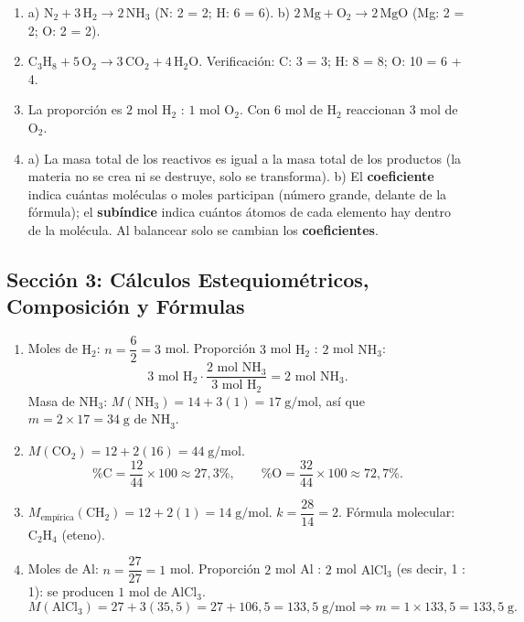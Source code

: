 \documentclass[12pt, letterpaper]{article}
\begin{document}
  \begin{enumerate}[leftmargin=*, label=\textbf{\arabic*.}]
    \item a) $\text{N}_2 + 3\,\text{H}_2 \rightarrow 2\,\text{NH}_3$ (N: 2 = 2; H: 6 = 6). \quad
          b) $2\,\text{Mg} + \text{O}_2 \rightarrow 2\,\text{MgO}$ (Mg: 2 = 2; O: 2 = 2).

    \item $\text{C}_3\text{H}_8 + 5\,\text{O}_2 \rightarrow 3\,\text{CO}_2 + 4\,\text{H}_2\text{O}$.
          Verificación: C: 3 = 3; H: 8 = 8; O: 10 = 6 + 4. \checkmark

    \item La proporción es $2$ mol $\text{H}_2$ : $1$ mol $\text{O}_2$. Con $6$ mol de $\text{H}_2$ reaccionan $3$ mol de $\text{O}_2$.

    \item a) La masa total de los reactivos es igual a la masa total de los productos (la materia no se crea ni se destruye, solo se transforma).
          \quad b) El \textbf{coeficiente} indica cuántas moléculas o moles participan (número grande, delante de la fórmula); el \textbf{subíndice} indica cuántos átomos de cada elemento hay dentro de la molécula. Al balancear solo se cambian los \textbf{coeficientes}.
  \end{enumerate}

  \newpage

  \subsection*{Sección 3: Cálculos Estequiométricos, Composición y Fórmulas}

  \begin{enumerate}[leftmargin=*, label=\textbf{\arabic*.}]
    \item Moles de $\text{H}_2$: $n = \dfrac{6}{2} = 3$ mol.
          Proporción $3$ mol $\text{H}_2$ : $2$ mol $\text{NH}_3$:
          \[
            3 \text{ mol H}_2 \cdot \frac{2 \text{ mol NH}_3}{3 \text{ mol H}_2} = 2 \text{ mol NH}_3.
          \]
          Masa de $\text{NH}_3$: $M(\text{NH}_3) = 14 + 3(1) = 17\;\text{g/mol}$, así que $m = 2 \times 17 = 34\;\text{g de NH}_3$.

    \item $M(\text{CO}_2) = 12 + 2(16) = 44\;\text{g/mol}$.
          \[
            \% \text{C} = \frac{12}{44} \times 100 \approx 27{,}3\%, \qquad \% \text{O} = \frac{32}{44} \times 100 \approx 72{,}7\%.
          \]

    \item $M_{\text{empírica}}(\text{CH}_2) = 12 + 2(1) = 14\;\text{g/mol}$. \quad $k = \dfrac{28}{14} = 2$.
          Fórmula molecular: $\text{C}_2\text{H}_4$ (eteno).

    \item Moles de Al: $n = \dfrac{27}{27} = 1$ mol. Proporción $2$ mol Al : $2$ mol $\text{AlCl}_3$ (es decir, 1 : 1): se producen $1$ mol de $\text{AlCl}_3$.
          \[
            M(\text{AlCl}_3) = 27 + 3(35{,}5) = 27 + 106{,}5 = 133{,}5\;\text{g/mol} \Rightarrow m = 1 \times 133{,}5 = 133{,}5\;\text{g}.
          \]
  \end{enumerate}

\fi
\end{document}
